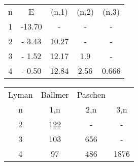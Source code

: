 \begin{indent}
\begin{tabular}{ |c|c|c|c|c| }
n &   E  & (n,1) & (n,2) & (n,3)  \\
1 & -13.70 &   -   &    -   &   -     \\
2 & - 3.43 & 10.27 &   -    &   -   \\
3 & - 1.52 & 12.17 & 1.9   &    -   \\
4 & - 0.50 & 12.84 & 2.56  & 0.666  \\
\end{tabular}
\end{indent}


\begin{indent}
\begin{tabular}{ |c|c|c|c| }
Lyman & Ballmer & Paschen   \\
n & 1,n &   2,n    & 3,n    \\
2 & 122 &    -      &   -     \\
3 & 103 &   656    &   -     \\
4 &  97 &   486    & 1876   \\
\end{tabular}
\end{indent}

